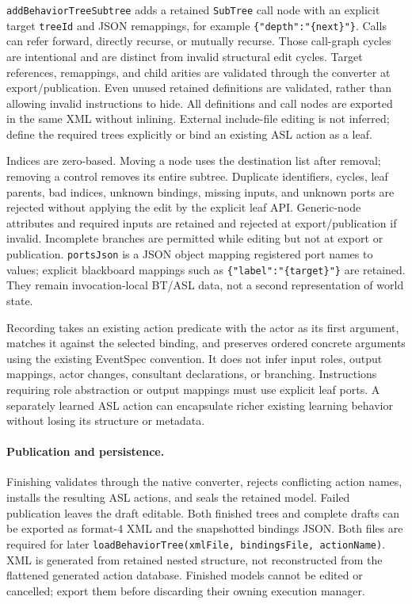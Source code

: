 \texttt{addBehaviorTreeSubtree} adds a retained \texttt{SubTree} call node with an
explicit target \texttt{treeId} and JSON remappings, for example
\texttt{\{"depth":"\{next\}"\}}. Calls can refer forward, directly recurse, or
mutually recurse. Those call-graph cycles are intentional and are distinct from
invalid structural edit cycles. Target references, remappings, and child arities
are validated through the converter at export/publication. Even unused retained
definitions are validated, rather than allowing invalid instructions to hide.
All definitions and call nodes are exported in the same XML without inlining.
External include-file editing is not inferred; define the required trees
explicitly or bind an existing ASL action as a leaf.

Indices are zero-based. Moving a node uses the destination list after removal;
removing a control removes its entire subtree. Duplicate identifiers, cycles,
leaf parents, bad indices, unknown bindings, missing inputs, and unknown ports
are rejected without applying the edit by the explicit leaf API. Generic-node
attributes and required inputs are retained and rejected at export/publication
if invalid. Incomplete branches are permitted while editing but not at export
or publication.
\texttt{portsJson} is a JSON object mapping registered port names to values;
explicit blackboard mappings such as \texttt{\{"label":"\{target\}"\}} are retained.
They remain invocation-local BT/ASL data, not a second representation of world state.

Recording takes an existing action predicate with the actor as its first
argument, matches it against the selected binding, and preserves ordered concrete
arguments using the existing EventSpec convention. It does not infer input roles,
output mappings, actor changes, consultant declarations, or branching.
Instructions requiring role abstraction or output mappings must use explicit
leaf ports. A separately learned ASL action can encapsulate richer existing
learning behavior without losing its structure or metadata.

\paragraph{Publication and persistence.}
Finishing validates through the native converter, rejects conflicting action
names, installs the resulting ASL actions, and seals the retained model.
Failed publication leaves the draft editable.
Both finished trees and complete drafts can be exported as format-4 XML and
the snapshotted bindings JSON. Both files are required for later
\texttt{loadBehaviorTree(xmlFile, bindingsFile, actionName)}.
XML is generated from retained nested structure, not reconstructed from the
flattened generated action database. Finished models cannot be edited or
cancelled; export them before discarding their owning execution manager.

